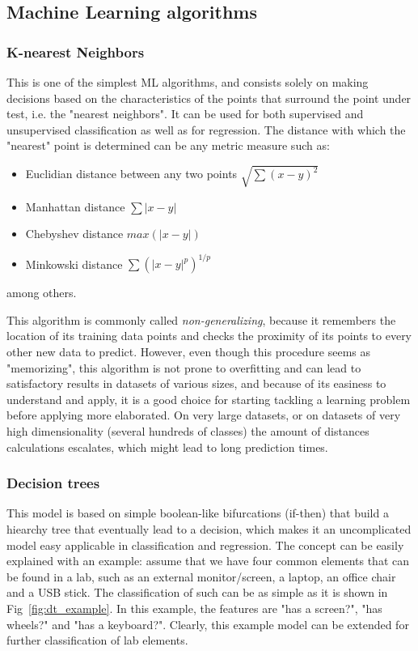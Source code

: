 \subsection{Machine Learning algorithms}\label{ch:ml_algs}
\subsubsection{K-nearest Neighbors}
This is one of the simplest \ac{ML} algorithms, and consists solely on making decisions based on the characteristics of the points that surround the point under test, i.e. the "nearest neighbors". It can be used for both supervised and unsupervised classification as well as for regression. The distance with which the "nearest" point is determined can be any metric measure such as:
\begin{itemize}
    \item Euclidian distance between any two points \( \sqrt{\sum (x - y)^2} \)
    \item Manhattan distance \( \sum {|x - y|} \)
    \item Chebyshev distance \( max(|x - y|) \)
    \item Minkowski distance \( \sum(|x - y|^p)^{1/p} \)
\end{itemize}
among others.

This algorithm is commonly called \emph{non-generalizing}, because it remembers the location of its training data points and checks the proximity of its points to every other new data to predict. However, even though this procedure seems as "memorizing", this algorithm is not prone to overfitting and can lead to satisfactory results in datasets of various sizes, and because of its easiness to understand and apply, it is a good choice for starting tackling a learning problem before applying more elaborated. On very large datasets, or on datasets of very high dimensionality (several hundreds of classes) the amount of distances calculations escalates, which might lead to long prediction times.

\subsubsection{Decision trees}
This model is based on simple boolean-like bifurcations (if-then) that build a hiearchy tree that eventually lead to a decision, which makes it an uncomplicated model easy applicable in classification and regression. The concept can be easily explained with an example: assume that we have four common elements that can be found in a lab, such as an external monitor/screen, a laptop, an office chair and a USB stick. The classification of such can be as simple as it is shown in Fig~\ref{fig:dt_example}. In this example, the features are "has a screen?", "has wheels?" and "has a keyboard?". Clearly, this example model can be extended for further classification of lab elements.

